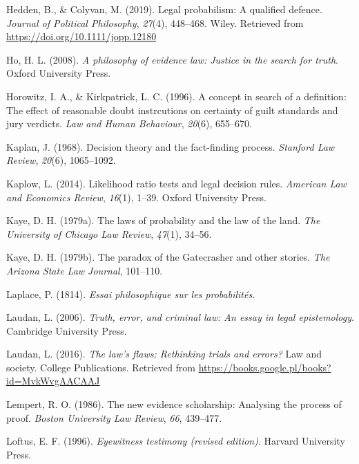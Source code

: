 \documentclass[10pt,dvipsnames,enabledeprecatedfontcommands]{scrartcl}
\begin{document}
\leavevmode\hypertarget{ref-HeddenColyvan2019legal}{}%
Hedden, B., \& Colyvan, M. (2019). Legal probabilism: A qualified
defence. \emph{Journal of Political Philosophy}, \emph{27}(4), 448--468.
Wiley. Retrieved from \url{https://doi.org/10.1111/jopp.12180}

\leavevmode\hypertarget{ref-ho2008philosophy}{}%
Ho, H. L. (2008). \emph{A philosophy of evidence law: Justice in the
search for truth}. Oxford University Press.

\leavevmode\hypertarget{ref-Horowitz1996}{}%
Horowitz, I. A., \& Kirkpatrick, L. C. (1996). A concept in search of a
definition: The effect of reasonable doubt instrcutions on certainty of
guilt standards and jury verdicts. \emph{Law and Human Behaviour},
\emph{20}(6), 655--670.

\leavevmode\hypertarget{ref-Kaplan1968decision}{}%
Kaplan, J. (1968). Decision theory and the fact-finding process.
\emph{Stanford Law Review}, \emph{20}(6), 1065--1092.

\leavevmode\hypertarget{ref-kaplow2014likelihood}{}%
Kaplow, L. (2014). Likelihood ratio tests and legal decision rules.
\emph{American Law and Economics Review}, \emph{16}(1), 1--39. Oxford
University Press.

\leavevmode\hypertarget{ref-kaye79}{}%
Kaye, D. H. (1979a). The laws of probability and the law of the land.
\emph{The University of Chicago Law Review}, \emph{47}(1), 34--56.

\leavevmode\hypertarget{ref-Kaye79gate}{}%
Kaye, D. H. (1979b). The paradox of the Gatecrasher and other stories.
\emph{The Arizona State Law Journal}, 101--110.

\leavevmode\hypertarget{ref-Laplace1814}{}%
Laplace, P. (1814). \emph{Essai philosophique sur les probabilités}.

\leavevmode\hypertarget{ref-laudan2006truth}{}%
Laudan, L. (2006). \emph{Truth, error, and criminal law: An essay in
legal epistemology}. Cambridge University Press.

\leavevmode\hypertarget{ref-laudan2016law}{}%
Laudan, L. (2016). \emph{The law's flaws: Rethinking trials and errors?}
Law and society. College Publications. Retrieved from
\url{https://books.google.pl/books?id=MvkWvgAACAAJ}

\leavevmode\hypertarget{ref-Lempert1986}{}%
Lempert, R. O. (1986). The new evidence scholarship: Analysing the
process of proof. \emph{Boston University Law Review}, \emph{66},
439--477.

\leavevmode\hypertarget{ref-Loftus1996}{}%
Loftus, E. F. (1996). \emph{Eyewitness testimony (revised edition)}.
Harvard University Press.
\end{document}
